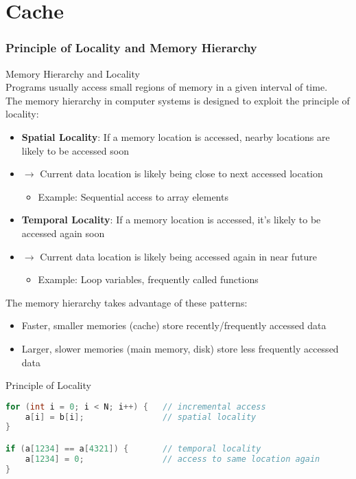 \section{Cache}



\subsubsection{Principle of Locality and Memory Hierarchy}

\begin{concept}{Memory Hierarchy and Locality}\\
Programs usually access small regions of memory in a given interval of time. \\
The memory hierarchy in computer systems is designed to exploit the principle of locality:
\begin{itemize}
    \item \textbf{Spatial Locality}: If a memory location is accessed, nearby locations are likely to be accessed soon
    \item $\rightarrow$ Current data location is likely being close to next accessed location
    \begin{itemize}
        \item Example: Sequential access to array elements
    \end{itemize}
    \item \textbf{Temporal Locality}: If a memory location is accessed, it's likely to be accessed again soon
    \item $\rightarrow$ Current data location is likely being accessed again in near future
    \begin{itemize}
        \item Example: Loop variables, frequently called functions
    \end{itemize}
\end{itemize}
The memory hierarchy takes advantage of these patterns:
\begin{itemize}
    \item Faster, smaller memories (cache) store recently/frequently accessed data
    \item Larger, slower memories (main memory, disk) store less frequently accessed data
\end{itemize}
\end{concept}

\begin{code}{Principle of Locality}
\begin{lstlisting}[language=C, style=basesmol]
for (int i = 0; i < N; i++) {   // incremental access
    a[i] = b[i];                // spatial locality
}

if (a[1234] == a[4321]) {       // temporal locality
    a[1234] = 0;                // access to same location again
} 
\end{lstlisting}  
\end{code}

